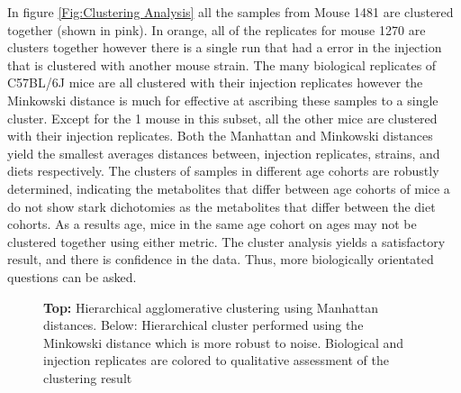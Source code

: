\documentclass[a4paper]{book}
\begin{document}
	In figure \ref{Fig:Clustering Analysis} all the samples from Mouse 1481 are clustered together (shown in pink). In orange, all of the replicates for mouse 1270 are clusters together however there is a single run that had a error in the injection that is clustered with another mouse strain.  The many biological replicates of C57BL/6J mice are all clustered with their injection replicates however the Minkowski distance is much for effective at ascribing these samples to a single cluster. Except for the 1 mouse in this subset, all the other mice are clustered with their injection replicates. Both the Manhattan and Minkowski distances yield the smallest averages distances between, injection replicates, strains, and diets respectively. The clusters of samples in different age cohorts are robustly determined, indicating the metabolites that differ between age cohorts of mice a do not show stark dichotomies as the metabolites that differ between the diet cohorts. As a results age, mice in the same age cohort on ages may not be clustered together using either metric. The cluster analysis yields a satisfactory result, and there is confidence in the data. Thus, more biologically orientated questions can be asked. 
	
	\begin{figure}[hbt!]
		\caption{ \textbf{Top:} Hierarchical agglomerative clustering using Manhattan distances. Below: Hierarchical cluster performed using the Minkowski distance which is more robust to noise. Biological and injection replicates are colored to qualitative assessment of the clustering result}
		\label{fig:Clustering Analysis}
	\end{figure}
	
\end{document}
